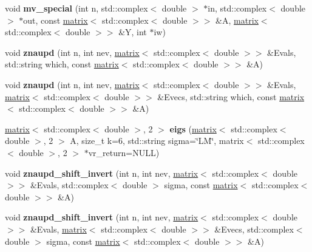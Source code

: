 \begin{DoxyCompactItemize}
\item 
\hypertarget{namespacekeycpp_adbe452cbd5260ac6506b4e3183648ea5}{void {\bfseries mv\-\_\-special} (int n, std\-::complex$<$ double $>$ $\ast$in, std\-::complex$<$ double $>$ $\ast$out, const \hyperlink{classkeycpp_1_1matrix}{matrix}$<$ std\-::complex$<$ double $>$$>$ \&A, \hyperlink{classkeycpp_1_1matrix}{matrix}$<$ std\-::complex$<$ double $>$$>$ \&Y, int $\ast$iw)}\label{namespacekeycpp_adbe452cbd5260ac6506b4e3183648ea5}

\item 
\hypertarget{namespacekeycpp_a456d28ae263f8e6d1ff7e991631ead1d}{void {\bfseries znaupd} (int n, int nev, \hyperlink{classkeycpp_1_1matrix}{matrix}$<$ std\-::complex$<$ double $>$$>$ \&Evals, std\-::string which, const \hyperlink{classkeycpp_1_1matrix}{matrix}$<$ std\-::complex$<$ double $>$$>$ \&A)}\label{namespacekeycpp_a456d28ae263f8e6d1ff7e991631ead1d}

\item 
\hypertarget{namespacekeycpp_a7c7ec79c7639fd54fb2ac13ab2044158}{void {\bfseries znaupd} (int n, int nev, \hyperlink{classkeycpp_1_1matrix}{matrix}$<$ std\-::complex$<$ double $>$$>$ \&Evals, \hyperlink{classkeycpp_1_1matrix}{matrix}$<$ std\-::complex$<$ double $>$$>$ \&Evecs, std\-::string which, const \hyperlink{classkeycpp_1_1matrix}{matrix}$<$ std\-::complex$<$ double $>$$>$ \&A)}\label{namespacekeycpp_a7c7ec79c7639fd54fb2ac13ab2044158}

\item 
\hypertarget{namespacekeycpp_a221e5a7364ba407f7a5201b66e7ae056}{\hyperlink{classkeycpp_1_1matrix}{matrix}$<$ std\-::complex$<$ double $>$, 2 $>$ {\bfseries eigs} (\hyperlink{classkeycpp_1_1matrix}{matrix}$<$ std\-::complex$<$ double $>$, 2 $>$ A, size\-\_\-t k=6, std\-::string sigma=\char`\"{}L\-M\char`\"{}, matrix$<$ std\-::complex$<$ double $>$, 2 $>$ $\ast$vr\-\_\-return=N\-U\-L\-L)}\label{namespacekeycpp_a221e5a7364ba407f7a5201b66e7ae056}

\item 
\hypertarget{namespacekeycpp_a82061266615ad24ba5b25324aae1cc12}{void {\bfseries znaupd\-\_\-shift\-\_\-invert} (int n, int nev, \hyperlink{classkeycpp_1_1matrix}{matrix}$<$ std\-::complex$<$ double $>$$>$ \&Evals, std\-::complex$<$ double $>$ sigma, const \hyperlink{classkeycpp_1_1matrix}{matrix}$<$ std\-::complex$<$ double $>$$>$ \&A)}\label{namespacekeycpp_a82061266615ad24ba5b25324aae1cc12}

\item 
\hypertarget{namespacekeycpp_ae57a4ddfa1c5ed22c8999a7cbb1daac2}{void {\bfseries znaupd\-\_\-shift\-\_\-invert} (int n, int nev, \hyperlink{classkeycpp_1_1matrix}{matrix}$<$ std\-::complex$<$ double $>$$>$ \&Evals, \hyperlink{classkeycpp_1_1matrix}{matrix}$<$ std\-::complex$<$ double $>$$>$ \&Evecs, std\-::complex$<$ double $>$ sigma, const \hyperlink{classkeycpp_1_1matrix}{matrix}$<$ std\-::complex$<$ double $>$$>$ \&A)}\label{namespacekeycpp_ae57a4ddfa1c5ed22c8999a7cbb1daac2}


\end{DoxyCompactItemize}

